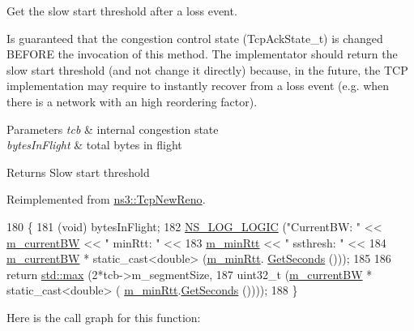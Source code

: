 Get the slow start threshold after a loss event. 

Is guaranteed that the congestion control state (Tcp\+Ack\+State\+\_\+t) is changed B\+E\+F\+O\+RE the invocation of this method. The implementator should return the slow start threshold (and not change it directly) because, in the future, the T\+CP implementation may require to instantly recover from a loss event (e.\+g. when there is a network with an high reordering factor).


\begin{DoxyParams}{Parameters}
{\em tcb} & internal congestion state \\
\hline
{\em bytes\+In\+Flight} & total bytes in flight \\
\hline
\end{DoxyParams}
\begin{DoxyReturn}{Returns}
Slow start threshold 
\end{DoxyReturn}


Reimplemented from \hyperlink{classns3_1_1TcpNewReno_a1cb467aaa4960dfe10b963ed9f3d5aa2}{ns3\+::\+Tcp\+New\+Reno}.


\begin{DoxyCode}
180 \{
181   (void) bytesInFlight;
182   \hyperlink{group__logging_ga88acd260151caf2db9c0fc84997f45ce}{NS\_LOG\_LOGIC} (\textcolor{stringliteral}{"CurrentBW: "} << \hyperlink{classns3_1_1TcpWestwood_a6cd16270e13f4ba8f1da9d5aa3a6d90b}{m\_currentBW} << \textcolor{stringliteral}{" minRtt: "} <<
183                 \hyperlink{classns3_1_1TcpWestwood_aa6eadb9dc36f52a850aa06ffea8c2dda}{m\_minRtt} << \textcolor{stringliteral}{" ssthresh: "} <<
184                 \hyperlink{classns3_1_1TcpWestwood_a6cd16270e13f4ba8f1da9d5aa3a6d90b}{m\_currentBW} * static\_cast<double> (\hyperlink{classns3_1_1TcpWestwood_aa6eadb9dc36f52a850aa06ffea8c2dda}{m\_minRtt}.
      \hyperlink{classns3_1_1Time_a8f20d5c3b0902d7b4320982f340b57c8}{GetSeconds} ()));
185 
186   \textcolor{keywordflow}{return} \hyperlink{80211b_8c_affe776513b24d84b39af8ab0930fef7f}{std::max} (2*tcb->m\_segmentSize,
187                    uint32\_t (\hyperlink{classns3_1_1TcpWestwood_a6cd16270e13f4ba8f1da9d5aa3a6d90b}{m\_currentBW} * static\_cast<double> (
      \hyperlink{classns3_1_1TcpWestwood_aa6eadb9dc36f52a850aa06ffea8c2dda}{m\_minRtt}.\hyperlink{classns3_1_1Time_a8f20d5c3b0902d7b4320982f340b57c8}{GetSeconds} ())));
188 \}
\end{DoxyCode}


Here is the call graph for this function\+:


